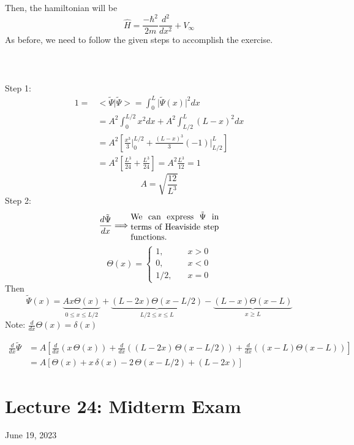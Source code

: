\documentclass[12pt,fancychapters]{report}
\numberwithin{equation}{section}
\begin{document}
Then, the hamiltonian will be 
\[
  \hat{H} = \frac{-\hbar^2}{2m}\frac{d^2}{dx^2} + V_\infty 
\]
As before, we need to follow the given steps to accomplish the exercise.\\
\\
\\
\\
Step 1: 
\begin{align*}
  1 =& \big<\tilde{\Psi}\big|\tilde{\Psi} \big> = \int_{0}^{L}\big|\tilde{\Psi}(x)\big|^2dx\\
  &= A^2 \int_{0}^{L/2} x^2 dx  + A^2\int_{L/2}^{L} (L-x)^2dx\\
  &= A^2 \left[\frac{x^3}{3}\bigg|_{0}^{L/2} + \frac{(L-x)^3}{3}(-1)\bigg|_{L/2}^{L}\right]\\
  &= A^2 \left[\frac{L^3}{24}+\frac{L^3}{24} \right] = A^2 \frac{L^3}{12} = 1
\end{align*}
\[
  \boxed{A = \sqrt{\frac{12}{L^3}}}
\]
Step 2: 
\[
  \frac{d\tilde{\Psi}}{dx} \Longrightarrow \parbox{0.3\textwidth}{We can express $\tilde{\Psi}$
  in terms of Heaviside step functions.}
\]
\[
  \Theta (x) = 
  \begin{cases}
    1, & \quad x>0\\
    0, & \quad x < 0\\
    1/2, & \quad x = 0
  \end{cases}
\]
Then
\[
  \tilde{\Psi}(x) = \underbrace{Ax\Theta(x)}_{0\leq x\leq L/2} + 
  \underbrace{(L-2x)\Theta(x-L/2)}_{L/2\leq x\leq L} - 
  \underbrace{(L-x)\Theta(x-L)}_{x\geq L}
\]
Note: $\frac{d}{dx}\Theta(x) = \delta(x)$

\begin{align*}
  \frac{d}{dx}\tilde{\Psi} &= A\left[\frac{d}{dx}(x\,\Theta(x)) + \frac{d}{dx}((L-2x)\,
  \Theta(x-L/2)) + \frac{d}{dx}((x-L)\Theta(x-L))\right]\\
                           &= A\left[\Theta(x)+x\,\delta(x) - 2\,\Theta(x-L/2)+
                           (L-2x)\right]
\end{align*}

\clearpage
\newpage
\section{Lecture 24: Midterm Exam}
June 19, 2023
\end{document}
